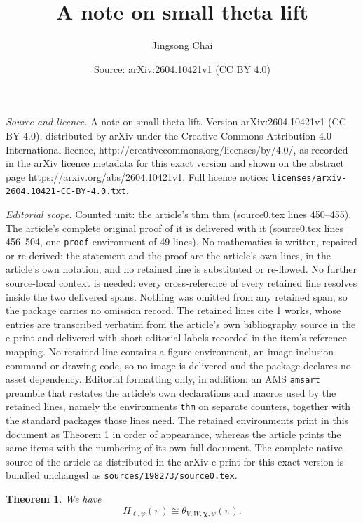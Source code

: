 \documentclass[10pt,a4paper]{amsart}
\title{A note on small theta lift}
\author{Jingsong Chai}
\date{Source: arXiv:2604.10421v1 (CC BY 4.0)}
\newtheorem{thm}{Theorem}
\begin{document}
\maketitle

\noindent\emph{Source and licence.} A note on small theta lift. Version arXiv:2604.10421v1 (CC BY 4.0), distributed by arXiv under the Creative Commons Attribution 4.0 International licence, http://creativecommons.org/licenses/by/4.0/, as recorded in the arXiv licence metadata for this exact version and shown on the abstract page https://arxiv.org/abs/2604.10421v1. Full licence notice: \texttt{licenses/arxiv-2604.10421-CC-BY-4.0.txt}.\par\smallskip

\noindent\textit{Editorial scope.} Counted unit: the article's thm thm (source0.tex lines 450--455). The article's complete original proof of it is delivered with it (source0.tex lines 456--504, one \texttt{proof} environment of 49 lines). No mathematics is written, repaired or re-derived: the statement and the proof are the article's own lines, in the article's own notation, and no retained line is substituted or re-flowed.  No further source-local context is needed: every cross-reference of every retained line resolves inside the two delivered spans.  Nothing was omitted from any retained span, so the package carries no omission record.  The retained lines cite 1 works, whose entries are transcribed verbatim from the article's own bibliography source in the e-print and delivered with short editorial labels recorded in the item's reference mapping.  No retained line contains a figure environment, an image-inclusion command or drawing code, so no image is delivered and the package declares no asset dependency.  Editorial formatting only, in addition: an AMS \texttt{amsart} preamble that restates the article's own declarations and macros used by the retained lines, namely the environments \texttt{thm} on separate counters, together with the standard packages those lines need.  The retained environments print in this document as Theorem 1 in order of appearance, whereas the article prints the same items with the numbering of its own full document.  The complete native source of the article as distributed in the arXiv e-print for this exact version is bundled unchanged as \texttt{sources/198273/source0.tex}.
\begin{thm}
We have 
\[
H_{\ell,\psi}(\pi)\cong \theta_{V,W,\boldsymbol{\chi},\psi}(\pi).
\]
\end{thm}
\end{document}
